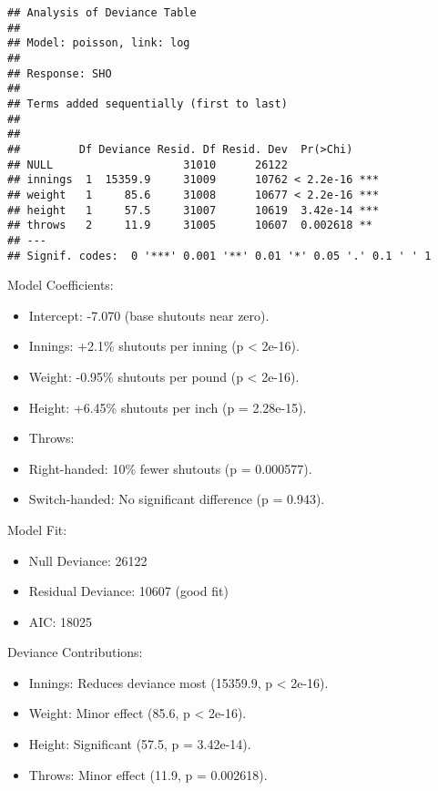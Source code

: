 \documentclass[
]{article}
\begin{document}
\begin{verbatim}
## Analysis of Deviance Table
## 
## Model: poisson, link: log
## 
## Response: SHO
## 
## Terms added sequentially (first to last)
## 
## 
##         Df Deviance Resid. Df Resid. Dev  Pr(>Chi)    
## NULL                    31010      26122              
## innings  1  15359.9     31009      10762 < 2.2e-16 ***
## weight   1     85.6     31008      10677 < 2.2e-16 ***
## height   1     57.5     31007      10619  3.42e-14 ***
## throws   2     11.9     31005      10607  0.002618 ** 
## ---
## Signif. codes:  0 '***' 0.001 '**' 0.01 '*' 0.05 '.' 0.1 ' ' 1
\end{verbatim}

Model Coefficients:

\begin{itemize}
\item
  Intercept: -7.070 (base shutouts near zero).
\item
  Innings: +2.1\% shutouts per inning (p \textless{} 2e-16).
\item
  Weight: -0.95\% shutouts per pound (p \textless{} 2e-16).
\item
  Height: +6.45\% shutouts per inch (p = 2.28e-15).
\item
  Throws:
\item
  Right-handed: 10\% fewer shutouts (p = 0.000577).
\item
  Switch-handed: No significant difference (p = 0.943).
\end{itemize}

Model Fit:

\begin{itemize}
\item
  Null Deviance: 26122
\item
  Residual Deviance: 10607 (good fit)
\item
  AIC: 18025
\end{itemize}

Deviance Contributions:

\begin{itemize}
\item
  Innings: Reduces deviance most (15359.9, p \textless{} 2e-16).
\item
  Weight: Minor effect (85.6, p \textless{} 2e-16).
\item
  Height: Significant (57.5, p = 3.42e-14).
\item
  Throws: Minor effect (11.9, p = 0.002618).
\end{itemize}
\end{document}
